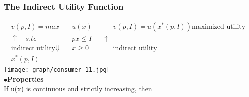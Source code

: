 \documentclass[letterpaper,13pt,single,pdftex]{scrartcl}
\begin{document}
\subsubsection{The Indirect Utility Function}
\begin{align*}
    v(p,I) = max\, &u(x) &  &v(p,I) = u(x^*(p,I)) \text{maximized utility}\\
    \uparrow \quad s.to \quad & px\le I \quad &\uparrow\\
    \text{indirect utility} \Downarrow \quad &x\ge 0 & &\text{indirect utility}\\
    x^*(p,I)&
\end{align*}
\texttt{[image: graph/consumer-11.jpg]}\\
$\bullet$\textbf{Properties}\\
If u(x) is continuous and strictly increasing, then 
\end{document}
